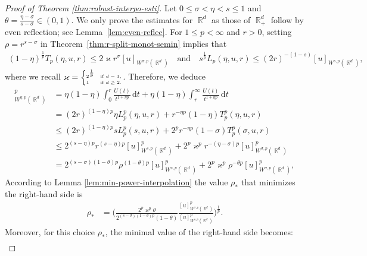 \documentclass[12pt, reqno]{amsart}%
\theoremstyle{plain}  %
\theoremstyle{definition}  %
\theoremstyle{remark}
\numberwithin{equation}{section}
\DeclareMathOperator{\R}{\mathbb{R}}
\renewcommand{\d}{\,\mathrm{d}}
\begin{document}
\begin{proof}[Proof of Theorem \ref{thm:robust-interpo-esti}]
Let $0\leq \sigma<\eta<s\leq 1$ and $\theta=\tfrac{\eta-\sigma}{s-\sigma}\in(0,1)$. We only prove the estimates for $\R^d$ as those of $\R^d_+$ follow by even reflection; see Lemma~\ref{lem:even-reflec}. For $1 \leq p < \infty$ and $r > 0$, setting $\rho = r^{s-\sigma}$ in Theorem~\ref{thm:r-split-monot-semin} implies that
\begin{align*}
(1-\eta)^{\frac{1}{p}} T_p(\eta, u, r) \leq 2\varkappa r^{\sigma} [u]_{W^{\sigma,p}(\R^d)} \quad \text{and} \quad s^{\frac{1}{p}} L_p(\eta, u, r) \leq (2r)^{-(1-s)} [u]_{W^{s,p}(\R^d)},
\end{align*}
where we recall $\tiny{\varkappa = \begin{cases} 2^{\frac{1}{p}}& \text{if } d = 1, \\ 1 & \text{if } d \geq 2. \end{cases}}$. Therefore, we deduce
\begin{align*}
[u]^p_{W^{\eta,p}(\R^d)}
&=\eta(1-\eta)\int_0^r \frac{U(t)}{t^{1+\eta p}} \d t + \eta(1-\eta)\int_r^\infty \frac{U(t)}{t^{1+\eta p}} \d t\\
&= (2r)^{(1-\eta)p} \eta L_p^p(\eta, u,r) + r^{-\eta p} (1-\eta)T_p^p(\eta, u,r) \\
&\leq (2r)^{(1-\eta)p} sL_p^p(s, u,r) + 2^pr^{-\eta p} (1-\sigma)T_p^p(\sigma, u,r) \\
& \leq 2^{(s-\eta) p}r^{(s-\eta) p}  [u]^p_{W^{s,p}(\R^d)}+ 2^p\varkappa^p r^{-(\eta-\sigma) p}  [u]^p_{W^{\sigma,p}(\R^d)}\\
&=2^{(s-\sigma)(1-\theta)p} \rho^{(1-\theta)p }  [u]^p_{W^{s,p}(\R^d)}+ 2^p\varkappa^p\rho^{-\theta p}  [u]^p_{W^{\sigma,p}(\R^d)},
\end{align*}
According to  Lemma \ref{lem:min-power-interpolation} the value $\rho_*$ that minimizes the right-hand side is
\begin{align*}
\rho_*
& = \Big( \frac{2^{p} \varkappa^p \theta }{2^{(s-\sigma)(1-\theta)p}(1-\theta) } \frac{[u]^p_{W^{\sigma,p}(\R^d)}}{[u]^p_{W^{s,p}(\R^d)}} \Big)^{\frac{1}{p}}.
\end{align*}
Moreover, for   this choice $\rho_*$, the minimal value of the right-hand side becomes:
\begin{align*}

\end{align*}
\end{proof}
\end{document}
